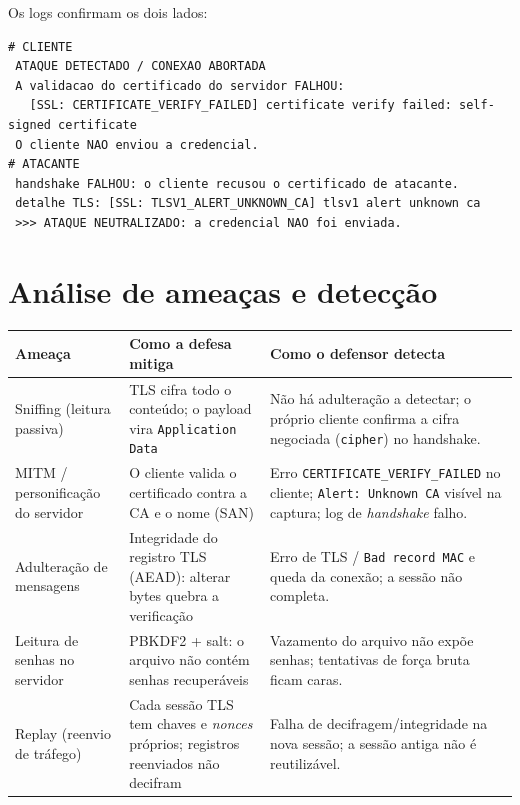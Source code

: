 \documentclass[11pt,a4paper]{article}
\begin{document}
Os logs confirmam os dois lados:
\begin{lstlisting}[style=saida]
# CLIENTE
 ATAQUE DETECTADO / CONEXAO ABORTADA
 A validacao do certificado do servidor FALHOU:
   [SSL: CERTIFICATE_VERIFY_FAILED] certificate verify failed: self-signed certificate
 O cliente NAO enviou a credencial.
# ATACANTE
 handshake FALHOU: o cliente recusou o certificado de atacante.
 detalhe TLS: [SSL: TLSV1_ALERT_UNKNOWN_CA] tlsv1 alert unknown ca
 >>> ATAQUE NEUTRALIZADO: a credencial NAO foi enviada.
\end{lstlisting}

\section{Análise de ameaças e detecção}
\label{sec:ameacas}

\begin{center}\small
\renewcommand{\arraystretch}{1.25}
\begin{tabular}{@{}p{3.1cm}p{5.0cm}p{6.0cm}@{}}
\toprule
\textbf{Ameaça} & \textbf{Como a defesa mitiga} & \textbf{Como o defensor detecta} \\
\midrule
Sniffing (leitura passiva) &
TLS cifra todo o conteúdo; o payload vira \texttt{Application Data} &
Não há adulteração a detectar; o próprio cliente confirma a cifra negociada
(\texttt{cipher}) no handshake. \\
MITM / personificação do servidor &
O cliente valida o certificado contra a CA e o nome (SAN) &
Erro \texttt{CERTIFICATE\_VERIFY\_FAILED} no cliente; \texttt{Alert: Unknown CA}
visível na captura; log de \textit{handshake} falho. \\
Adulteração de mensagens &
Integridade do registro TLS (AEAD): alterar bytes quebra a verificação &
Erro de TLS / \texttt{Bad record MAC} e queda da conexão; a sessão não completa. \\
Leitura de senhas no servidor &
PBKDF2 + salt: o arquivo não contém senhas recuperáveis &
Vazamento do arquivo não expõe senhas; tentativas de força bruta ficam caras. \\
Replay (reenvio de tráfego) &
Cada sessão TLS tem chaves e \textit{nonces} próprios; registros reenviados não
decifram &
Falha de decifragem/integridade na nova sessão; a sessão antiga não é reutilizável. \\
\bottomrule
\end{tabular}
\end{center}
\end{document}
